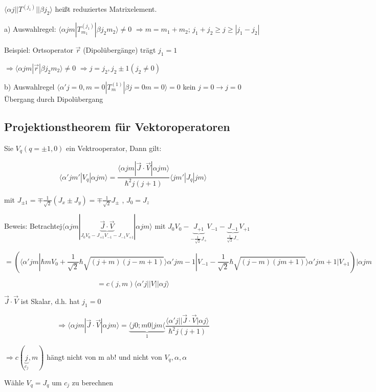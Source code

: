 \(\langle \alpha j||T^{(j_1)}|| \beta j_2\rangle \) heißt reduziertes
  Matrixelement.

a) Auswahlregel:   \(\langle \alpha jm|T^{(j_1)}_{m_1}|\beta j_2 m_2\rangle\neq 0\) \(\Rightarrow m= m_1+m_2\);  \(j_1+j_2 \geq j\geq |j_1-j_2|\)

Beispiel: Ortsoperator \(\vec r\) (Dipolübergänge) trägt \(j_1=1\)

\(\Rightarrow \langle \alpha jm|\vec r|\beta j_2 m_2\rangle \neq 0\)
\(\Rightarrow j=j_2, j_2\pm 1 (j_2\neq 0)\)

b) Auswahlregel \(\langle \alpha' j=0, m=0|T^{(1)}_{m}|\beta j=0
m=0\rangle = 0\) kein \(j=0 \rightarrow j=0\) Übergang durch Dipolübergang

\subsection{Projektionstheorem für Vektoroperatoren}
Sie \(V_q(q=\pm 1, 0)\) ein Vektrooperator, Dann gilt:

\[\langle \alpha' jm'|V_q|\alpha j m\rangle 
= \frac{\langle \alpha jm|\vec J\cdot \vec V|\alpha j m\rangle}{\hbar^2 j(j+1)} \langle jm'|J_q| j m\rangle \]

mit \(J_{\pm 1}= \mp \frac {1}{\sqrt 2} (J_x\pm J_y) = \mp  \frac {1}{\sqrt 2} J_\pm\) , \(J_0=J_z\)

Beweis: Betrachtej\(\langle \alpha jm|\underbrace{\vec J\cdot \vec V}_{J_0V_0-J_{+1}V_{-1}-J_{-1}V_{+1}}|\alpha j m\rangle \)
mit \(J_0V_0-\underbrace{J_{+1}}_{-\frac {1}{\sqrt 2}J_+}V_{-1}-\underbrace{J_{-1}}_{\frac {1}{\sqrt 2}J_-}V_{+1}\)

\[=\left( \langle \alpha' jm| \hbar m V_0 + \frac {1}{\sqrt 2}\hbar
  \sqrt{(j+ m)(j-m+1)} \rangle \alpha' j m-1|V_{-1} -  \frac {1}{\sqrt 2}\hbar
  \sqrt{(j- m)(jm+1)} \rangle \alpha' j m+1| V_{+1} \right) |\alpha jm \]


\[ = c (j,m)  \langle \alpha'j||V||\alpha j\rangle \]

\(\vec J\cdot \vec V\) ist Skalar, d.h. hat \(j_1=0\)

\[\Rightarrow \langle \alpha jm|\vec J\cdot \vec V|\alpha jm\rangle =
\underbrace{\langle j 0; m 0 |jm\langle}_{1} \frac{\langle \alpha' j||\vec J\cdot \vec V|\alpha j\rangle}{\hbar^2 j(j+1)} 
\]

\(\Rightarrow c(\underbrace{j}_{c_j},m)\) hängt nicht von m ab! und
nicht von \(V_q,\alpha,\alpha\)

Wähle \(V_q=J_q\) um \(c_j\) zu berechnen

